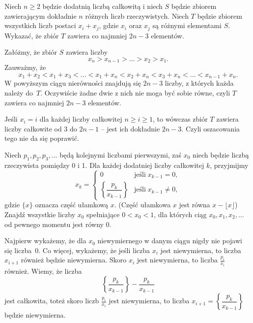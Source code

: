 \vspace{5px}

\begin{problem}{2}
	Niech $n \geqslant 2$ będzie dodatnią liczbą całkowitą i niech $S$ będzie zbiorem zawierającym dokładnie $n$ różnych liczb rzeczywistych. Niech $T$ będzie zbiorem wszystkich liczb postaci $x_i + x_j$, gdzie $x_i$ oraz $x_j$ są różnymi elementami $S$. Wykazać, że zbiór $T$ zawiera co najmniej $2n - 3$ elementów.
\end{problem}

\noindent
Załóżmy, że zbiór $S$ zawiera liczby
\[
	x_n > x_{n - 1} > ... > x_2 > x_1.
\]
Zauważmy, że
\[
	x_1 + x_2 < x_1 + x_3 <  ... <  x_1 + x_n <  x_2 + x_n <  x_3 + x_n < ... < x_{n - 1} + x_n.
\]
W powyższym ciągu nierówności znajdują się $2n - 3$ liczby, z których każda należy do~$T$. Oczywiście żadne dwie z nich nie moga być sobie równe, czyli $T$ zawiera co najmniej $2n - 3$ elementów.

\vspace{10px}

\begin{remark}
	Jeśli $x_i = i$ dla każdej liczby całkowitej $n \geqslant i \geqslant 1$, to wówczas zbiór $T$ zawiera liczby całkowite od $3$ do $2n - 1$ -- jest ich dokładnie $2n - 3$. Czyli oszacowania tego nie da się poprawić.
\end{remark}

\vspace{5px}

\begin{problem}{3}
	Niech $p_1, p_2, p_3, \ldots$ będą kolejnymi liczbami pierwszymi, zaś $x_0$ niech będzie liczbą rzeczywista pomiędzy 0 i 1. Dla każdej dodatniej liczby całkowitej $k$, przyjmijmy
\[
	x_k = \begin{cases} 
	0 & \text{jeśli} \; x_{k-1} = 0, \\
	\left\{ \dfrac{p_k}{x_{k-1}} \right\} & \text{jeśli} \; x_{k-1} \neq 0, 
	\end{cases}  
\]
gdzie $\{x\}$ oznacza część ułamkową $x$. (Część ułamkowa $x$ jest równa $x - \lfloor x \rfloor$) Znajdź wszystkie liczby $x_0$ spełniające $0 < x_0 < 1$, dla których ciąg $x_0, x_1, x_2, \ldots$ od pewnego momentu jest równy 0.
\end{problem}


\noindent
Najpierw wykażemy, że dla $x_0$ niewymiernego w danym ciągu nigdy nie pojawi się liczba~$0$. Co więcej, wykażemy, że jeśli liczba $x_i$ jest niewymierna, to liczba $x_{i + 1}$ również będzie niewymierna. Skoro $x_i$ jest niewymierna, to liczba $\frac{p_i}{x_i}$ również. Wiemy, że liczba
\[
	\left\{ \dfrac{p_k}{x_{k-1}} \right\} - \dfrac{p_k}{x_{k-1}}
\]
jest całkowita, toteż skoro liczb $\frac{p_i}{x_i}$ jest niewymierna, to liczba $x_{i + 1} = \left\{ \dfrac{p_k}{x_{k-1}} \right\}$ będzie niewymierna.

